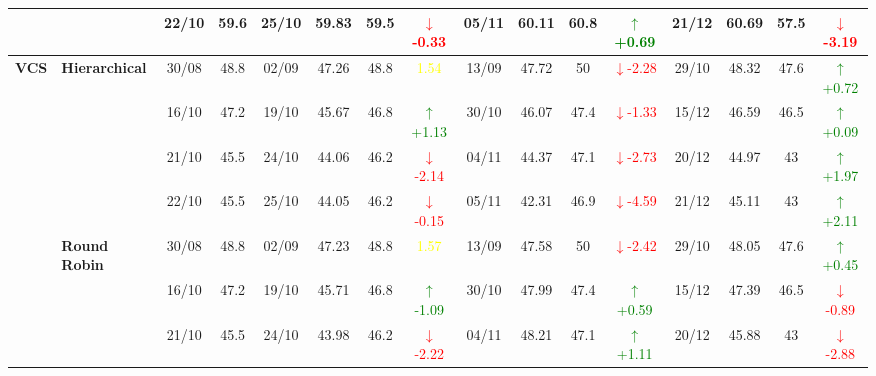 \documentclass{ieeeaccess}
\begin{document}
{\begin{longtable}{llcc|cccc|cccc|cccc}
&
& 22/10 & 59.6 & 25/10 & 59.83 & 59.5 & \textcolor{red}{\(\downarrow\)-0.33} & 05/11 & 60.11 & 60.8 & \textcolor{green}{\(\uparrow\)+0.69} & 21/12 & 60.69 & 57.5 & \textcolor{red}{\(\downarrow\)-3.19} \\
\midrule



\multirow{12}{*}{\textbf{VCS}} 
& \textbf{Hierarchical}
& 30/08 & 48.8 & 02/09 & 47.26 & 48.8 & \textcolor{yellow}{1.54} & 13/09 & 47.72 & 50 & \textcolor{red}{\(\downarrow\)-2.28} & 29/10 & 48.32 & 47.6 & \textcolor{green}{\(\uparrow\)+0.72} \\

&
& 16/10 & 47.2 & 19/10 & 45.67 & 46.8 & \textcolor{green}{\(\uparrow\)+1.13} & 30/10 & 46.07 & 47.4 & \textcolor{red}{\(\downarrow\)-1.33} & 15/12 & 46.59 & 46.5 & \textcolor{green}{\(\uparrow\)+0.09} \\

&
& 21/10 & 45.5 & 24/10 & 44.06 & 46.2 & \textcolor{red}{\(\downarrow\)-2.14} & 04/11 & 44.37 & 47.1 & \textcolor{red}{\(\downarrow\)-2.73} & 20/12 & 44.97 & 43 & \textcolor{green}{\(\uparrow\)+1.97} \\

&
& 22/10 & 45.5 & 25/10 & 44.05 & 46.2 & \textcolor{red}{\(\downarrow\)-0.15} & 05/11 & 42.31 & 46.9 & \textcolor{red}{\(\downarrow\)-4.59} & 21/12 & 45.11 & 43 & \textcolor{green}{\(\uparrow\)+2.11} \\
\cmidrule(lr){2-16}


& \textbf{Round Robin}
& 30/08 & 48.8 & 02/09 & 47.23 & 48.8 & \textcolor{yellow}{1.57} & 13/09 & 47.58 & 50 & \textcolor{red}{\(\downarrow\)-2.42} & 29/10 & 48.05 & 47.6 & \textcolor{green}{\(\uparrow\)+0.45} \\

&
& 16/10 & 47.2 & 19/10 & 45.71 & 46.8 & \textcolor{green}{\(\uparrow\)-1.09} & 30/10 & 47.99 & 47.4 & \textcolor{green}{\(\uparrow\)+0.59} & 15/12 & 47.39 & 46.5 & \textcolor{red}{\(\downarrow\)-0.89} \\

&
& 21/10 & 45.5 & 24/10 & 43.98 & 46.2 & \textcolor{red}{\(\downarrow\)-2.22} & 04/11 & 48.21 & 47.1 & \textcolor{green}{\(\uparrow\)+1.11} & 20/12 & 45.88 & 43 & \textcolor{red}{\(\downarrow\)-2.88} \\


\end{longtable}}
\end{document}

